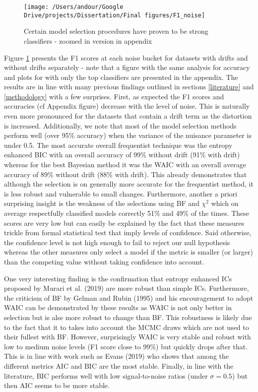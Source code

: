 \documentclass[12pt,]{article}
\begin{document}
\begin{figure}

{\centering \texttt{[image: /Users/andour/Google Drive/projects/Dissertation/Final figures/F1\_noise]} 

}

\caption{Certain model selection procedures have proven to be strong classifiers - zoomed in version in appendix}\label{fig:f1trend}
\end{figure}

Figure \ref{fig:f1trend} presents the F1 scores at each noise bucket for datasets with drifts and without drifts separately - note that a figure with the same analysis for accuracy and plots for with only the top classifiers are presented in the appendix. The results are in line with many previous findings outlined in sections \ref{literature} and \ref{methodology} with a few surprises. First, as expected the F1 scores and accuracies (cf Appendix figure) decrease with the level of noise. This is naturally even more pronounced for the datasets that contain a drift term as the distortion is increased.
Additionally, we note that most of the model selection methods perform well (over 95\% accuracy) when the variance of the nuisance parameter is under 0.5. The most accurate overall frequentist technique was the entropy enhanced BIC with an overall accuracy of 99\% without drift (91\% with drift) whereas for the best Bayesian method it was the WAIC with an overall average accuracy of 89\% without drift (88\% with drift). This already demonstrates that although the selection is on generally more accurate for the frequentist method, it is less robust and vulnerable to small changes. Furthermore, another a priori surprising insight is the weakness of the selections using BF and \(\chi^2\) which on average respectfully classified models correctly 51\% and 49\% of the times. These scores are very low but can easily be explained by the fact that these measures trickle from formal statistical test that imply levels of confidence. Said otherwise, the confidence level is not high enough to fail to reject our null hypothesis whereas the other measures only select a model if the metric is smaller (or larger) than the competing value without taking confidence into account.

One very interesting finding is the confirmation that entropy enhanced ICs proposed by Murari et al. (2019) are more robust than simple ICs. Furthermore, the criticism of BF by Gelman and Rubin (1995) and his encouragement to adopt WAIC can be demonstrated by these results as WAIC is not only better in selection but is alse more robust to change than BF. This robustness is likely due to the fact that it to takes into account the MCMC draws which are not used to their fullest with BF. However, surprisingly WAIC is very stable and robust with low to medium noise levels (F1 score close to 99\%) but quickly drops after that. This is in line with work such as Evans (2019) who shows that among the different metrics AIC and BIC are the most stable. Finally, in line with the literature, BIC performs well with low signal-to-noise ratios (under \(\sigma = 0.5\)) but then AIC seems to be more stable.
\end{document}
